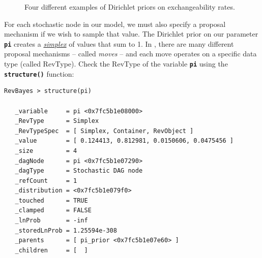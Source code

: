 \documentclass[11pt]{article}
\newcommand{\cl}[1]{{\texttt{\textbf{#1}}}}
\begin{document}
\begin{figure}[h!]
\centering
{}
\caption{\small Four different examples of Dirichlet priors on exchangeability rates.}
\label{dirichletFig}
\end{figure}

For each stochastic node in our model, we must also specify a proposal mechanism if we wish to sample that value. 
The Dirichlet prior on our parameter \cl{pi} creates a \href{http://en.wikipedia.org/wiki/Simplex}{\textit{simplex}} of values that sum to 1. 
In \RevBayes, there are many different proposal mechanisms -- called \textit{moves} -- and each move operates on a specific data type (called RevType). 
Check the RevType of the variable \cl{pi} using the \cl{structure()} function:
{\tt \small \begin{snugshade*}
\begin{lstlisting}
RevBayes > structure(pi)

   _variable     = pi <0x7fc5b1e08000>
   _RevType      = Simplex
   _RevTypeSpec  = [ Simplex, Container, RevObject ]
   _value        = [ 0.124413, 0.812981, 0.0150606, 0.0475456 ]
   _size         = 4
   _dagNode      = pi <0x7fc5b1e07290>
   _dagType      = Stochastic DAG node
   _refCount     = 1
   _distribution = <0x7fc5b1e079f0>
   _touched      = TRUE
   _clamped      = FALSE
   _lnProb       = -inf
   _storedLnProb = 1.25594e-308
   _parents      = [ pi_prior <0x7fc5b1e07e60> ]
   _children     = [  ]
\end{lstlisting}
\end{snugshade*}}
\end{document}
